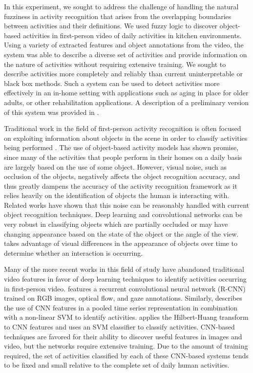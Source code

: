\documentclass[12pt]{report}
\begin{document}
In this experiment, we sought to address the challenge of handling the natural fuzziness in activity recognition that arises from the overlapping boundaries between activities and their definitions. We used fuzzy logic to discover object-based activities in first-person video of daily activities in kitchen environments. Using a variety of extracted features and object annotations from the video, the system was able to describe a diverse set of activities and provide information on the nature of activities without requiring extensive training. We sought to describe activities more completely and reliably than current uninterpretable or black box methods. Such a system can be used to detect activities more effectively in an in-home setting with applications such as aging in place for older adults, or other rehabilitation applications. A description of a preliminary version of this system was provided in \cite{Schneider2021BridgingVideo}.

Traditional work in the field of first-person activity recognition is often focused on exploiting information about objects in the scene in order to classify activities being performed \cite{Nakatani2019, McCandless2013, Pirsiavash2012, Sudhakaran2018, Wang2018}. The use of object-based activity models has shown promise, since many of the activities that people perform in their homes on a daily basis are largely based on the use of some object. However, visual noise, such as occlusion of the objects, negatively affects the object recognition accuracy, and thus greatly dampens the accuracy of the activity recognition framework as it relies heavily on the identification of objects the human is interacting with. Related works have shown that this noise can be reasonably handled with current object recognition techniques. Deep learning and convolutional networks can be very robust in classifying objects which are partially occluded or may have changing appearance based on the state of the object or the angle of the view. \cite{Pirsiavash2012} takes advantage of visual differences in the appearance of objects over time to determine whether an interaction is occurring.

Many of the more recent works in this field of study have abandoned traditional video features in favor of deep learning techniques to identify activities occurring in first-person video.   \cite{Li} features a recurrent convolutional neural network (R-CNN) trained on RGB images, optical flow, and gaze annotations. Similarly, \cite{Ryoo2015} describes the use of CNN features in a pooled time series representation in combination with a non-linear SVM to identify activities. \cite{Purwanto2017} applies the Hilbert-Huang transform to CNN features and uses an SVM classifier to classify activities. CNN-based techniques are favored for their ability to discover useful features in images and video, but the networks require extensive training. Due to the amount of training required, the set of activities classified by each of these CNN-based systems tends to be fixed and small relative to the complete set of daily human activities.
\end{document}

